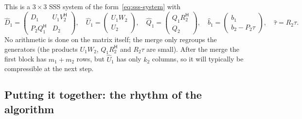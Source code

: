 \documentclass[11pt]{article}
\newcommand{\ct}{^{\mathsf H}}            %
\newcommand{\hU}{\widehat U}
\newcommand{\hQ}{\widehat Q}
\newcommand{\hD}{\widehat D}
\newcommand{\hb}{\hat b}
\newcommand{\htau}{\hat\tau}
\theoremstyle{definition}
\begin{document}
This is a $3\times3$ SSS system of the form~\eqref{eq:sss-system} with
\[
\hD_1=\begin{pmatrix} D_1 & U_1V_2\ct\\ P_2Q_1\ct & D_2\end{pmatrix},\quad
\hU_1=\begin{pmatrix} U_1W_2\\ U_2\end{pmatrix},\quad
\hQ_1=\begin{pmatrix} Q_1R_2\ct\\ Q_2\end{pmatrix},\quad
\hb_1=\begin{pmatrix} b_1\\ b_2-P_2\tau\end{pmatrix},\quad
\htau = R_2\tau .
\]
No arithmetic is done on the matrix itself; the merge only regroups the
generators (the products $U_1W_2$, $Q_1R_2\ct$ and $R_2\tau$ are small).
After the merge the first block has $m_1+m_2$ rows, but $\hU_1$ has only
$k_2$ columns, so it will typically be compressible at the next step.

\subsection{Putting it together: the rhythm of the algorithm}
\end{document}
